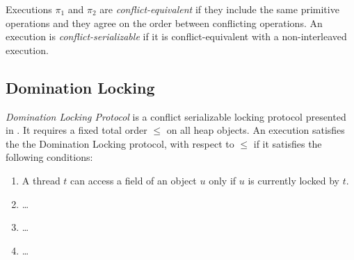 \documentclass{article}
\begin{document}


Executions $\pi_1$ and $\pi_2$ are \emph{conflict-equivalent} 
if they include the same primitive operations and they 
agree on the order between conflicting operations. 
An execution is \emph{conflict-serializable} if it is 
conflict-equivalent with a non-interleaved execution.



\subsection{Domination Locking}
\emph{Domination Locking Protocol} is a conflict serializable
locking protocol presented in \cite{Gueta2011}. 
It requires a fixed total order $\leq$ on all heap objects. 
An execution satisfies the the Domination Locking protocol,
with respect to $\leq$ if it satisfies the following conditions:
\begin{enumerate}
  \item A thread $t$ can access a field of 
  an object $u$ only if $u$ is
  currently locked by $t$.
  \item \ldots
  \item \ldots 
  \item \ldots
\end{enumerate}
\end{document}
